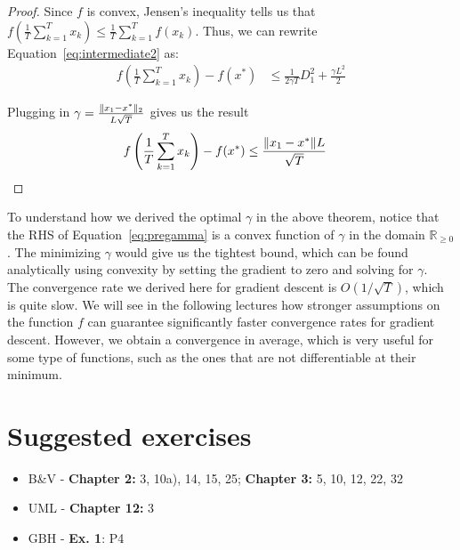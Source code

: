 \documentclass{article}
\newcommand{\R}{\mathbb{R}}
\DeclarePairedDelimiter{\norm}{\lVert}{\rVert}
\begin{document}
\begin{proof}
Since $f$ is convex, Jensen's inequality tells us that $f\left(\frac{1}{T}\sum_{k=1}^T x_k\right) \leq \frac{1}{T}\sum_{k=1}^T f(x_k)$. Thus, we can rewrite Equation~\ref{eq:intermediate2} as:
\begin{align}
f\left(\frac{1}{T}\sum_{k=1}^T x_k\right)-f(x^\ast) &\leq \frac{1}{2\gamma T} D_1^2 + \frac{\gamma L^2}{2} \label{eq:pregamma}
\end{align}

Plugging in $\gamma=\frac{\norm{x_1 - x^\ast}_2}{L \sqrt{T}}$ gives us the result
\begin{align*}
f\left(\frac{1}{T}\sum_{k=1}^T x_k\right) - f(x^\ast) &\leq \frac{\norm{x_1 - x^\ast}L}{\sqrt{T}}
\end{align*}
\end{proof}

To understand how we derived the optimal $\gamma$ in the above theorem, notice that the RHS of Equation~\ref{eq:pregamma} is a convex function of $\gamma$ in the domain $\R_{\geq 0}$. The minimizing $\gamma$ would give us the tightest bound, which can be found analytically using convexity by setting the gradient to zero and solving for $\gamma$.\\

The convergence rate we derived here for gradient descent is $O(1/\sqrt{T})$, which is quite slow. We will see in the following lectures how stronger assumptions on the function $f$ can guarantee significantly faster convergence rates for gradient descent. However, we obtain a convergence in average, which is very useful for some type of functions, such as the ones that are not differentiable at their minimum.



\section*{Suggested exercises}

\begin{itemize}
    \item B\&V \cite{boyd2004convex} - \textbf{Chapter 2:} 3, 10a), 14, 15, 25; \textbf{Chapter 3:} 5, 10, 12, 22, 32
    \item UML \cite{Shalev-Shwartz:2014:UML:2621980} - \textbf{Chapter 12:} 3
    \item GBH \cite{Gower} - \textbf{Ex. 1}: P4
\end{itemize}




\end{document}

